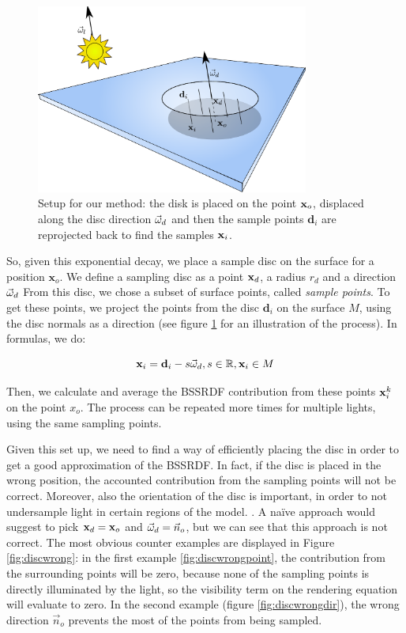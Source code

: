 \begin{figure}
\centering
\includegraphics[width=0.8\textwidth]{images/disk_setup.pdf}
\caption{Setup for our method: the disk is placed on the point $\mathbf{x}_o$, displaced along the disc direction $\vec{\omega}_d$ and then the sample points $\mathbf{d}_i$ are reprojected back to find the samples $\mathbf{x}_i$.}
\label{fig:disksetup}
\end{figure}
\FloatBarrier

So, given this exponential decay, we place a sample disc on the surface for a position $\mathbf{x}_o$. We define a sampling disc as a point $\mathbf{x}_d$, a radius $r_d$ and a direction $\vec{\omega}_d$ From this disc, we chose a subset of surface points, called \emph{sample points}. To get these points, we project the points from the disc $\mathbf{d}_i$ on the surface $M$, using the disc normals as a direction (see figure \ref{fig:disksetup} for an illustration of the process). In formulas, we do:

\begin{equation*}
\mathbf{x}_i = \mathbf{d}_i - s \vec{\omega}_d, s \in \mathbb{R}, \mathbf{x}_i \in M
\end{equation*}

Then, we calculate and average the BSSRDF contribution from these points $\mathbf{x}_i^k$ on the point $x_o$. The process can be repeated more times for multiple lights, using the same sampling points. 

Given this set up, we need to find a way of efficiently placing the disc in order to get a good approximation of the BSSRDF. In fact, if the disc is placed in the wrong position, the accounted contribution from the sampling points will not be correct. Moreover, also the orientation of the disc is important, in order to not undersample light in certain regions of the model. . A na\"{i}ve approach would suggest to pick $\mathbf{x}_d = \mathbf{x}_o$ and $\vec{\omega}_d = \vec{n}_o$, but we can see that this approach is not correct. The most obvious counter examples are displayed in Figure \ref{fig:discwrong}: in the first example \ref{fig:discwrongpoint}, the contribution from the surrounding points will be zero, because none of the sampling points is directly illuminated by the light, so the visibility term on the rendering equation will evaluate to zero. In the second example (figure \ref{fig:discwrongdir}), the wrong direction $\vec{n}_o$ prevents the most of the points from being sampled.

